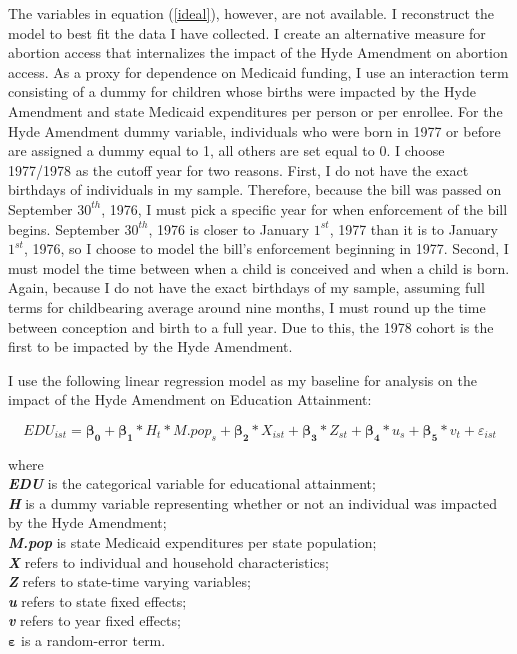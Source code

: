         The variables in equation (\ref{ideal}), however, are not available. I reconstruct the model to best fit the data I have collected. I create an alternative measure for abortion access that internalizes the impact of the Hyde Amendment on abortion access. As a proxy for dependence on Medicaid funding, I use an interaction term consisting of a dummy for children whose births were impacted by the Hyde Amendment and state Medicaid expenditures per person or per enrollee. For the Hyde Amendment dummy variable, individuals who were born in 1977 or before are assigned a dummy equal to 1, all others are set equal to 0. I choose 1977/1978 as the cutoff year for two reasons. First, I do not have the exact birthdays of individuals in my sample. Therefore, because the bill was passed on September $30^{th}$, 1976, I must pick a specific year for when enforcement of the bill begins. September $30^{th}$, 1976 is closer to January $1^{st}$, 1977 than it is to January $1^{st}$, 1976, so I choose to model the bill's enforcement beginning in 1977. Second, I must model the time between when a child is conceived and when a child is born. Again, because I do not have the exact birthdays of my sample, assuming full terms for childbearing average around nine months, I must round up the time between conception and birth to a full year. Due to this, the 1978 cohort is the first to be impacted by the Hyde Amendment.

        I use the following linear regression model as my baseline for analysis on the impact of the Hyde Amendment on Education Attainment:

        \begin{equation}\label{reg1}
            EDU_{ist} = \boldsymbol{\beta_{0}} + \boldsymbol{\beta_{1}}*H_{t}*M.pop_{s} + \boldsymbol{\beta_{2}}*X_{ist} + \boldsymbol{\beta_{3}}*Z_{st} + \boldsymbol{\beta_{4}}*u_{s} + \boldsymbol{\beta_{5}}*v_{t} + \varepsilon _{ist}
        \end{equation}

        \noindent where \\

            \noindent\textbf{\textit{EDU}} is the categorical variable for educational attainment; \\
            \textbf{\textit{H}} is a dummy variable representing whether or not an individual was impacted by the Hyde Amendment; \\
            \textbf{\textit{M.pop}} is state Medicaid expenditures per state population; \\
            \textbf{\textit{X}} refers to individual and household characteristics; \\
            \textbf{\textit{Z}} refers to state-time varying variables; \\
            \textbf{\textit{u}} refers to state fixed effects; \\
            \textbf{\textit{v}} refers to year fixed effects; \\
            $\boldsymbol{\varepsilon}$ is a random-error term.\\

